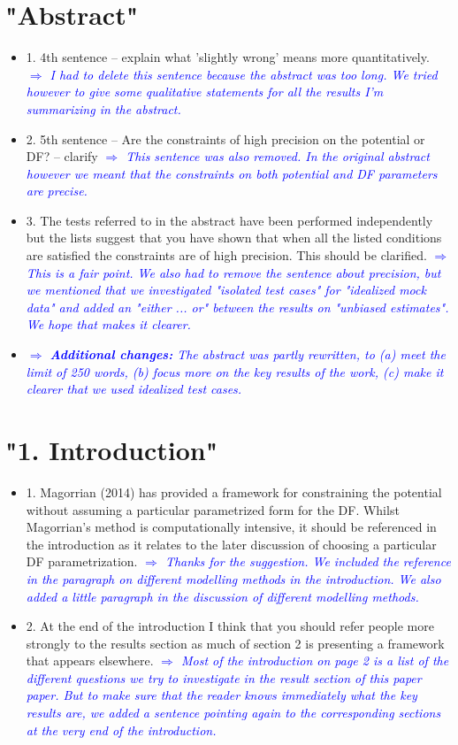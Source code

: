 \documentclass[10pt,a4paper]{article}
\newcommand{\Comment}[1]{\textsl{\textcolor{Blue}{$\Longrightarrow$ {#1}}}}
\begin{document}
\section{"Abstract"}
\begin{itemize}
\item 1. 4th sentence -- explain what 'slightly wrong' means more quantitatively. \Comment{I had to delete this sentence because the abstract was too long. We tried however to give some qualitative statements for all the results I'm summarizing in the abstract.}
\item 2. 5th sentence -- Are the constraints of high precision on the potential or DF? -- clarify \Comment{This sentence was also removed. In the original abstract however we meant that the constraints on both potential and DF parameters are precise.}
\item 3. The tests referred to in the abstract have been performed independently but the lists suggest that you have shown that when all the listed conditions are satisfied the constraints are of high precision. This should be clarified. \Comment{This is a fair point. We also had to remove the sentence about precision, but we mentioned that we investigated "isolated test cases" for "idealized mock data" and added an "either ... or" between the results on "unbiased estimates". We hope that makes it clearer.}
\item \Comment{\textbf{Additional changes:} The abstract was partly rewritten, to (a) meet the limit of 250 words, (b) focus more on the key results of the work, (c) make it clearer that we used idealized test cases.}
\end{itemize}

\section{"1. Introduction"}
\begin{itemize}
\item 1. Magorrian (2014) has provided a framework for constraining the potential without assuming a particular parametrized form for the DF. Whilst Magorrian's method is computationally intensive, it should be referenced in the introduction as it relates to the later discussion of choosing a particular DF parametrization. \Comment{Thanks for the suggestion. We included the reference in the paragraph on different modelling methods in the introduction. We also added a little paragraph in the discussion of different modelling methods.}
\item 2. At the end of the introduction I think that you should refer people more strongly to the results section as much of section 2 is presenting a framework that appears elsewhere. \Comment{Most of the introduction on page 2 is a list of the different questions we try to investigate in the result section of this paper paper. But to make sure that the reader knows immediately what the key results are, we added a sentence pointing again to the corresponding sections at the very end of the introduction.}
\end{itemize}
\end{document}
